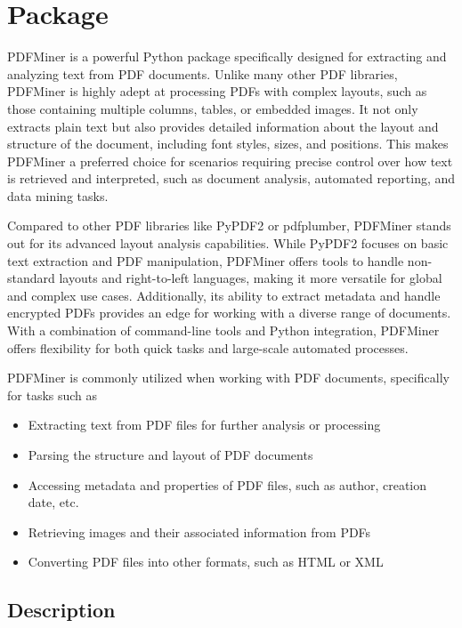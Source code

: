 %
%
%
\chapter{Package }

PDFMiner is a powerful Python package specifically designed for extracting and analyzing text from PDF documents. Unlike many other PDF libraries, PDFMiner is highly adept at processing PDFs with complex layouts, such as those containing multiple columns, tables, or embedded images. It not only extracts plain text but also provides detailed information about the layout and structure of the document, including font styles, sizes, and positions. This makes PDFMiner a preferred choice for scenarios requiring precise control over how text is retrieved and interpreted, such as document analysis, automated reporting, and data mining tasks.

Compared to other PDF libraries like PyPDF2 or pdfplumber, PDFMiner stands out for its advanced layout analysis capabilities. While PyPDF2 focuses on basic text extraction and PDF manipulation, PDFMiner offers tools to handle non-standard layouts and right-to-left languages, making it more versatile for global and complex use cases. Additionally, its ability to extract metadata and handle encrypted PDFs provides an edge for working with a diverse range of documents. With a combination of command-line tools and Python integration, PDFMiner offers flexibility for both quick tasks and large-scale automated processes.\cite{Python:2024Pdfminer}


PDFMiner is commonly utilized when working with PDF documents, specifically for tasks such as

\begin{itemize}
    \item Extracting text from PDF files for further analysis or processing
    \item Parsing the structure and layout of PDF documents
    \item Accessing metadata and properties of PDF files, such as author, creation date, etc.
    \item Retrieving images and their associated information from PDFs
    \item Converting PDF files into other formats, such as HTML or XML
\end{itemize}

\section{Description}

